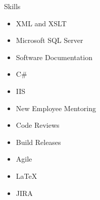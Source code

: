 \documentclass{resume} %
\begin{document}



\begin{rSection}{Skills}
\begin{multicols}{3}
\begin{enumerate}
\begin{itemize}
\item XML and XSLT
\item Microsoft SQL Server
\item Software Documentation
\item C\# 
\item IIS
\item New Employee Mentoring
\item Code Reviews
\item Build Releases
\item Agile
\item LaTeX
\item JIRA
\end{itemize}
\end{enumerate}
\end{multicols}
\end{rSection}

\end{document}
